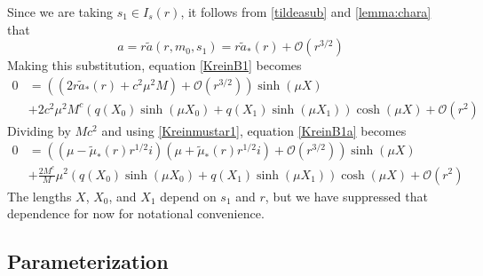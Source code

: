 \documentclass[thesis.tex]{subfiles}
\begin{document}
Since we are taking $s_1 \in I_s(r)$, it follows from \cref{tildeasub} and \cref{lemma:chara} that
\[
a = r \tilde{a}(r, m_0, s_1) = r\tilde{a}_*(r) + \mathcal{O}\left( r^{3/2} \right)
\]
Making this substitution, equation \cref{KreinB1} becomes
\begin{equation}\label{KreinB1a}
\begin{aligned}
0 &= \left( (2r\tilde{a}_*(r) + c^2 \mu^2 M) + \mathcal{O}( r^{3/2} )\right) \sinh(\mu X) \\
&+ 2 c^2 \mu^2 M^c ( q(X_0) \sinh(\mu X_0) + q(X_1) \sinh(\mu X_1) ) \cosh(\mu X) + \mathcal{O}( r^2 ) 
\end{aligned}
\end{equation}
Dividing by $M c^2$ and using \cref{Kreinmustar1}, equation \cref{KreinB1a} becomes
\begin{equation}\label{KreinB2}
\begin{aligned}
0 &= \left( (\mu - \tilde{\mu}_*(r) r^{1/2} i)( \mu + \tilde{\mu}_*(r) r^{1/2} i) +  \mathcal{O}( r^{3/2} )\right) \sinh(\mu X) \\
&+\frac{2 M^c}{M} \mu^2 ( q(X_0)\sinh(\mu X_0) + q(X_1) \sinh(\mu X_1) ) \cosh(\mu X) + \mathcal{O}( r^2 ) 
\end{aligned}
\end{equation}
The lengths $X$, $X_0$, and $X_1$ depend on $s_1$ and $r$, but we have suppressed that dependence for now for notational convenience. 

\subsection{Parameterization}
\end{document}
